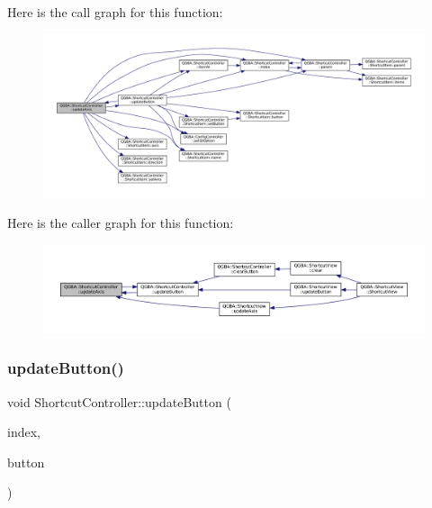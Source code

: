 Here is the call graph for this function\+:
\nopagebreak
\begin{figure}[H]
\begin{center}
\leavevmode
\includegraphics[width=350pt]{class_q_g_b_a_1_1_shortcut_controller_acb5c4ceb4c05eb8a2352d386250a6ab3_cgraph}
\end{center}
\end{figure}
Here is the caller graph for this function\+:
\nopagebreak
\begin{figure}[H]
\begin{center}
\leavevmode
\includegraphics[width=350pt]{class_q_g_b_a_1_1_shortcut_controller_acb5c4ceb4c05eb8a2352d386250a6ab3_icgraph}
\end{center}
\end{figure}
\mbox{\label{class_q_g_b_a_1_1_shortcut_controller_a1f49dde502461ba467e49d81c458271b}} 
\subsubsection{\texorpdfstring{update\+Button()}{updateButton()}}
{\footnotesize\ttfamily void Shortcut\+Controller\+::update\+Button (\begin{DoxyParamCaption}\item[{const Q\+Model\+Index \&}]{index,  }\item[{\mbox{\hyperlink{ioapi_8h_a787fa3cf048117ba7123753c1e74fcd6}{int}}}]{button }\end{DoxyParamCaption})}

